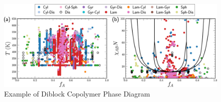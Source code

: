 \documentclass{article}
\begin{document}
\begin{figure}[h]
\caption{Example of Diblock Copolymer Phase Diagram\cite{RandForest}}
\centering
\includegraphics[width=\textwidth]{template/images_large_mz1c00521_0001.jpeg}
\end{figure}




\end{document}
